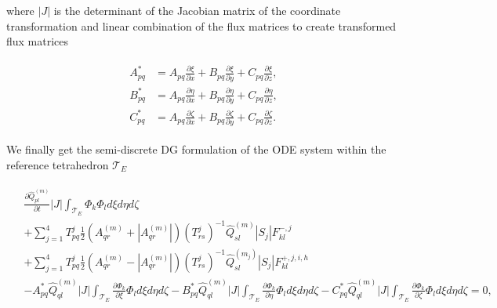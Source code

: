 where $\left|J\right|$ is the determinant of the Jacobian matrix of the coordinate transformation and linear combination of the flux matrices to create transformed flux matrices

\begin{align}
    \begin{split}
        A_{pq}^{*} &= A_{pq} \frac{\partial \xi}{\partial x} + B_{pq} \frac{\partial \xi}{\partial y} + C_{pq} \frac{\partial \xi}{\partial z}, \\
        B_{pq}^{*} &= A_{pq} \frac{\partial \eta}{\partial x} + B_{pq} \frac{\partial \eta}{\partial y} + C_{pq} \frac{\partial \eta}{\partial z}, \\ 
        C_{pq}^{*} &= A_{pq} \frac{\partial \zeta}{\partial x} + B_{pq} \frac{\partial \zeta}{\partial y} + C_{pq} \frac{\partial \zeta}{\partial z}. 
    \end{split}
\end{align}

We finally get the semi-discrete \ac{DG} formulation of the ODE system within the reference tetrahedron $\mathcal{T}_E$

\begin{align}
    \begin{split}
        & \frac{\partial \hat{Q}_{pl}^{\left(m\right)}}{\partial t} \left|J\right| \int_{\mathcal{T}_E} \Phi_k \Phi_l d\xi d\eta d\zeta \\
        & + \sum_{j=1}^4 T_{pq}^j \frac{1}{2} \left(A_{qr}^{\left(m\right)} + \left| A_{qr}^{\left(m\right)}\right| \right) \left(T_{rs}^j\right)^{-1} \hat{Q}_{sl}^{\left(m\right)} \left|S_j\right| F_{kl}^{-,j} \\
        & + \sum_{j=1}^4 T_{pq}^j \frac{1}{2} \left(A_{qr}^{\left(m\right)} - \left| A_{qr}^{\left(m\right)}\right| \right) \left(T_{rs}^j\right)^{-1} \hat{Q}_{sl}^{\left(m_j\right)}\left|S_j\right| F_{kl}^{+,j,i,h} \\ 
        & - A_{pq}^* \hat{Q}_{ql}^{\left(m\right)} \left|J\right| \int_{\mathcal{T}_E} \frac{\partial \Phi_k}{\partial \xi} \Phi_l d\xi d\eta d\zeta
        - B_{pq}^* \hat{Q}_{ql}^{\left(m\right)} \left|J\right| \int_{\mathcal{T}_E} \frac{\partial \Phi_k}{\partial \eta} \Phi_l d\xi d\eta d\zeta
        - C_{pq}^* \hat{Q}_{ql}^{\left(m\right)} \left|J\right| \int_{\mathcal{T}_E} \frac{\partial \Phi_k}{\partial \zeta} \Phi_l d\xi d\eta d\zeta = 0,
    \end{split}
    \label{eq:finalform}
\end{align}

